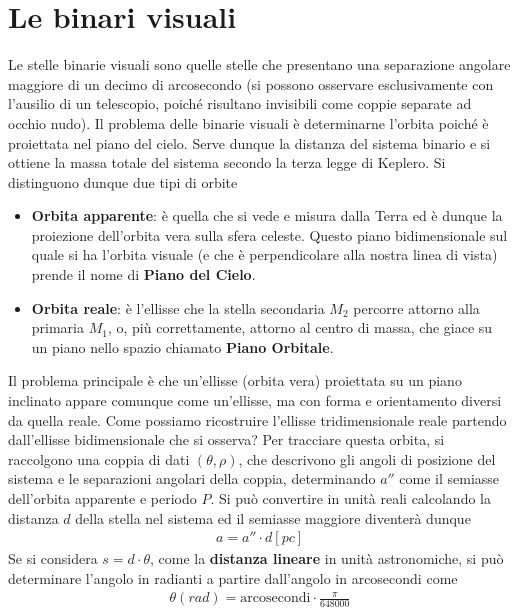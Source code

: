 \documentclass[a4paper, oneside]{book}
\begin{document}
\section{Le binari visuali}
Le stelle binarie visuali sono quelle stelle che presentano una separazione angolare maggiore 
di un decimo di arcosecondo (si possono osservare esclusivamente con l'ausilio di un telescopio, poiché risultano
invisibili come coppie separate ad occhio nudo). Il problema delle 
binarie visuali è determinarne l'orbita poiché è 
proiettata nel piano del cielo. Serve dunque la distanza del sistema binario e si ottiene la 
massa totale del sistema secondo la terza legge di Keplero.  Si distinguono dunque due tipi di orbite
\begin{itemize}
    \item \textbf{Orbita apparente}: è quella che si vede e misura dalla Terra ed è dunque
    la proiezione dell'orbita vera sulla sfera celeste. Questo piano bidimensionale sul quale si ha 
    l'orbita visuale (e che è perpendicolare alla nostra linea di vista) prende il nome di \textbf{Piano del Cielo}.
    \item \textbf{Orbita reale}: è l'ellisse che la stella secondaria $M_2$ percorre attorno alla primaria $M_1$, 
    o, più correttamente, attorno al centro di massa, che giace su un piano nello spazio chiamato \textbf{Piano Orbitale}. 
\end{itemize}
Il problema principale è che un'ellisse (orbita vera) proiettata su un piano inclinato 
appare comunque come un'ellisse, ma con forma e orientamento diversi da quella reale. Come 
possiamo ricostruire l'ellisse tridimensionale reale partendo dall'ellisse bidimensionale 
che si osserva? 
Per tracciare questa orbita, si raccolgono una coppia di dati $(\theta, \rho)$, che descrivono gli angoli
di posizione del sistema e le separazioni angolari della coppia, determinando $a''$ come il semiasse 
dell'orbita apparente e periodo $P$. Si può convertire in unità reali calcolando la distanza $d$ della stella nel sistema
ed il semiasse maggiore diventerà dunque 
\begin{gather*}
    [AU]a = a'' \cdot d[pc]
\end{gather*}
Se si considera $s = d \cdot \theta$, come la \textbf{distanza lineare} in unità astronomiche, 
si può determinare l'angolo in radianti a partire dall'angolo in arcosecondi come 
\begin{gather*}
    \theta(rad) = \text{arcosecondi} \cdot  \frac{\pi}{648000} 
\end{gather*}
\end{document}
